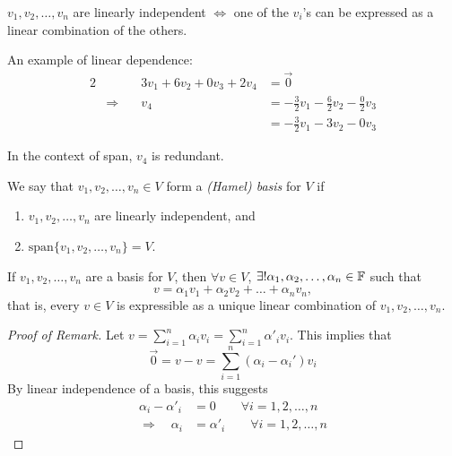 \begin{remark*}
$v_1, v_2, \dots, v_n$ are linearly independent $\Longleftrightarrow$ one of the $v_i$'s can be expressed as a linear combination of the others.
\end{remark*}

\begin{example}
An example of linear dependence:
    \begin{alignat*}{2}
        && 3v_1 + 6v_2 + 0v_3 + 2v_4 &= \vec{0} \\
        & \Longrightarrow \quad & v_4 &= -\frac{3}{2}v_1 - \frac{6}{2}v_2 - \frac{0}{2}v_3 \\
                            &&&= -\frac{3}{2}v_1 - 3v_2 - 0v_3
    \end{alignat*}

In the context of span, $v_4$ is redundant.
\end{example}

\begin{definition}[Basis]
\label{def:basis}
We say that $v_1, v_2, \dots, v_n \in V$ form a \textit{(Hamel) basis} for $V$ if
\begin{enumerate}[label=(\roman*)]
    \item $v_1, v_2, \dots, v_n$ are linearly independent, and
    \item $\text{span}\{v_1, v_2, \dots, v_n\} = V$.
\end{enumerate}
\end{definition}

\begin{remark*}
If $v_1, v_2, \dots, v_n$ are a basis for $V$, then $\forall v \in V$, $\exists! \alpha_1, \alpha_2, \dots, \alpha_n \in \mathbb F$ such that 
$$
v = \alpha_1v_1 + \alpha_2v_2 + \dots + \alpha_nv_n,
$$
that is, every $v \in V$ is expressible as a unique linear combination of $v_1, v_2, \dots, v_n$.

\begin{proof}[Proof of Remark]
Let $v = \sum_{i=1}^n \alpha_iv_i = \sum_{i=1}^n \alpha'_iv_i$. This implies that
$$
\vec{0} = v - v = \sum_{i=1}^n (\alpha_i - \alpha_i')v_i
$$
By linear independence of a basis, this suggests
\begin{align*}
    \alpha_i - \alpha'_i &= 0 \quad\quad \forall i = 1, 2, \dots, n \\
    \Rightarrow \quad \alpha_i &= \alpha'_i \quad\quad \forall i = 1, 2, \dots, n
\end{align*}
\end{proof}
\end{remark*}

